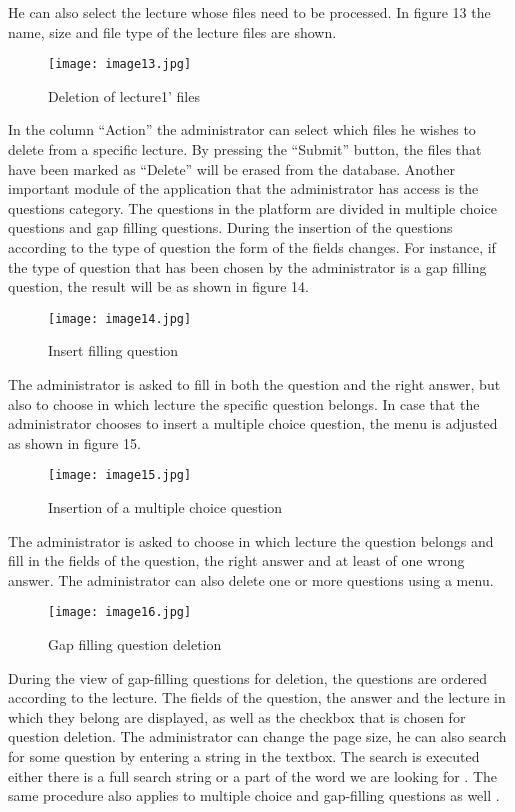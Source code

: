 \documentclass[10pt, conference, compsocconf]{IEEEtran}
\begin{document}
He can also select the lecture whose files need to be processed. In figure 13 the name, size and file type of the lecture files are shown.

\begin{figure}[!h]
	\centering
	\texttt{[image: image13.jpg]}
	\caption{Deletion of lecture1' files}
\end{figure}

In the column “Action” the administrator can select which files he wishes to delete from a specific lecture. By pressing the “Submit” button, the files that have been marked as “Delete” will be erased from the database. Another important module of the application that the administrator has access is the questions category. The questions in the platform  are divided in multiple choice questions and gap filling questions. During the insertion of the questions according to the type of question  the form of the fields changes. For instance, if the type of question that has been chosen by the administrator is a gap filling question, the result will be as shown in figure 14.

\begin{figure}[!h]
	\centering
	\texttt{[image: image14.jpg]}
	\caption{Insert filling question}
\end{figure}

The administrator is asked to fill in both the question and the right answer, but also to choose in which lecture the specific question belongs. In case that the administrator chooses to insert a multiple choice question, the menu is adjusted as shown in figure 15.

\begin{figure}[!h]
	\centering
	\texttt{[image: image15.jpg]}
	\caption{Insertion of a multiple choice question}
\end{figure}


The administrator is asked to choose in which lecture the question belongs and fill in the fields of the question, the right answer and at least of one wrong answer. The administrator can also delete one or more questions using a menu. 

\begin{figure}[!h]
	\centering
	\texttt{[image: image16.jpg]}
	\caption{Gap filling question deletion}
\end{figure}


During the view of gap-filling questions for deletion, the questions are ordered according to the lecture. The fields of the question, the answer and the lecture in which they belong are displayed, as well as the checkbox that is chosen for question deletion. The administrator can change the page size, he can also search for some question by entering  a string in the textbox. The search is executed either there is a full search string or a part of the word we are looking for  . The same procedure also applies to multiple choice and gap-filling questions as well .
\end{document}
